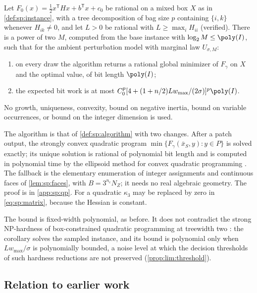 \begin{corollary}\label{cor:sp:qp}
Let $F_0(x)=\frac12x^{\mathsf T}Hx+b^{\mathsf T}x+c_0$ be rational on a mixed
box $X$ as in \cref{def:sp:instance}, with a tree decomposition of bag size
$p$ containing $\{i,k\}$ whenever $H_{ik}\ne0$, and let $L>0$ be rational
with $L\ge\max_iH_{ii}$ (verified). There is a power of two $M$, computed
from the base instance with $\log_2M\le\poly(I)$, such that for the ambient
perturbation model with marginal law $U_{\sigma,M}$:
\begin{enumerate}[label=(\roman*)]
\item on every draw the algorithm returns a rational global minimizer of
$F_\gamma$ on $X$ and the optimal value, of bit length $\poly(I)$;
\item the expected bit work is at most
$C_0^p[4+(1+n/2)Lw_{\max}/(2\sigma)]^p\poly(I)$.
\end{enumerate}
No growth, uniqueness, convexity, bound on negative inertia, bound on variable
occurrences, or bound on the integer dimension is used.
\end{corollary}

The algorithm is that of \cref{def:sp:algorithm} with two changes. After a
patch output, the strongly convex quadratic program
$\min\{F_\gamma(\bar x_S,y):y\in P\}$ is solved exactly; its unique solution
is rational of polynomial bit length and is computed in polynomial time by
the ellipsoid method for convex quadratic programming
\citep{kozlov1980-the-polynomial-solvability-of-convex}. The fallback is the elementary
enumeration of integer assignments and continuous faces of
\cref{lem:sp:faces}, with $B=3^{n_c}N_Z$; it needs no real algebraic
geometry. The proof is in \cref{app:sp:qp}. For a quadratic $\kappa_3$ may be
replaced by zero in \eqref{eq:sp:matrix}, because the Hessian is constant.

The bound is fixed-width polynomial, as before. It does not contradict the
strong NP-hardness of box-constrained quadratic programming at treewidth two
\citep{pia2026-treewidth-and-the-complexity-of}: the corollary solves the sampled instance,
and its bound is polynomial only when $Lw_{\max}/\sigma$ is polynomially
bounded, a noise level at which the decision thresholds of such hardness
reductions are not preserved (\cref{prop:lim:threshold}).

\subsection{Relation to earlier work}\label{sec:sp:prior}

